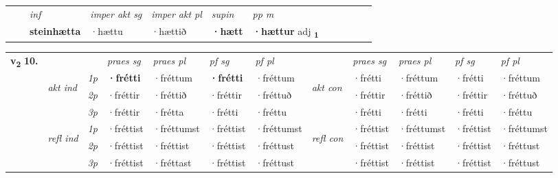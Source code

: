 \begin{tabular}{llllllllllll}
 & & \textit{inf} & \textit{imper akt sg} & \textit{imper akt pl}    & \textit{supin}  & \textit{pp m}     \\*
  & & \textbf{steinhætta} & ·hættu  & ·hættið    &  \textbf{·hætt}  & \textbf{·hættur} adj \textbf{\textsubscript{1}} \\*
\cmidrule{1-12}
\end{tabular}



\begin{tabular}{llllllllllll} \toprule
\multirow{4}{*}{{{\textbf{v{\textsubscript{2}}} \Large{\textbf{10.}}}}}  & &   &  \textit{praes sg}  & \textit{praes pl}  &\textit{ pf sg} & \textit{pf pl} &  &  \textit{praes sg}  & \textit{praes pl}  & \textit{pf sg} & \textit{pf pl } \\*
	\cmidrule{4-7} \cmidrule{9-12}
 & \multirow{3}{*}{\begin{turn}{90}\textit{akt ind}\end{turn}} & {\textit{1p}} & \textbf{·frétti} & ·fréttum    & \textbf{·frétti} & ·fréttum & \multirow{3}{*}{\begin{turn}{90}\textit{akt con}\end{turn}} &·frétti & ·fréttum & ·frétti & ·fréttum\\*
& &  {\textit{2p}} &  ·fréttir  & ·fréttið   & ·fréttir & ·fréttuð & & ·fréttir & ·fréttið & ·fréttir & ·fréttuð \\*
& &  {\textit{3p}} & ·fréttir & ·frétta   & ·frétti & ·fréttu & & ·frétti & ·frétti& ·frétti & ·fréttu  \\*
\cmidrule{4-7} \cmidrule{9-12}
 &\multirow{3}{*}{\begin{turn}{90}\textit{refl ind}\end{turn}} & {\textit{1p}} & ·fréttist & ·fréttumst    & ·fréttist & ·fréttumst & \multirow{3}{*}{\begin{turn}{90}\textit{refl con}\end{turn}}  &·fréttist & ·fréttumst & ·fréttist & ·fréttumst\\*
 &&  {\textit{2p}} &  ·fréttist  & ·fréttist   & ·fréttist & ·fréttust & &·fréttist & ·fréttist & ·fréttist & ·fréttust \\*
& &  {\textit{3p}} & ·fréttist & ·fréttast   & ·fréttist & ·fréttust & & ·fréttist & ·fréttist& ·fréttist & ·fréttust  \\*
\cmidrule{4-7} \cmidrule{9-12}
\end{tabular}


